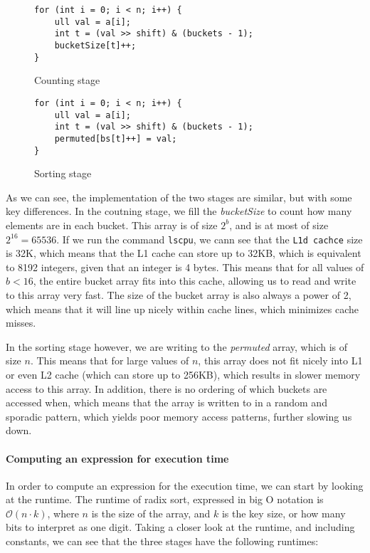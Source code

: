 \documentclass{article}
\begin{document}
\begin{figure}[h]
    \centering

    \begin{minipage}{0.47\textwidth}
        \begin{lstlisting}
for (int i = 0; i < n; i++) {
    ull val = a[i];
    int t = (val >> shift) & (buckets - 1);
    bucketSize[t]++;
}
        \end{lstlisting}
        \caption{Counting stage}
    \end{minipage}\hfill
    \begin{minipage}{0.47\textwidth}
        \begin{lstlisting}
for (int i = 0; i < n; i++) {
    ull val = a[i];                         
    int t = (val >> shift) & (buckets - 1);
    permuted[bs[t]++] = val;
}
        \end{lstlisting}
        \caption{Sorting stage}
    \end{minipage}
    \end{figure}

    As we can see, the implementation of the two stages are similar, but with some key differences. In the coutning stage, we fill the \textit{bucketSize} to count how many elements are in each bucket. This array is of size \( 2^{b} \), and is at most of size \( 2^{16} = 65536 \). If we run the command \texttt{lscpu}, we cann see that the \texttt{L1d cachce} size is 32K, which means that the L1 cache can store up to 32KB, which is equivalent to 8192 integers, given that an integer is 4 bytes. This means that for all values of \( b < 16\), the entire bucket array fits into this cache, allowing us to read and write to this array very fast. The size of the bucket array is also always a power of 2, which means that it will line up nicely within cache lines, which minimizes cache misses.
\medskip

In the sorting stage however, we are writing to the \textit{permuted} array, which is of size \( n \). This means that for large values of \( n \), this array does not fit nicely into L1 or even L2 cache (which can store up to 256KB), which results in slower memory access to this array. In addition, there is no ordering of which buckets are accessed when, which means that the array is written to in a random and sporadic pattern, which yields poor memory access patterns, further slowing us down.
\medskip

\paragraph{Computing an expression for execution time}
In order to compute an expression for the execution time, we can start by looking at the runtime. The runtime of radix sort, expressed in big O notation is \( \mathcal{O}\left(n \cdot  k\right) \), where \( n \) is the size of the array, and \( k \) is the key size, or how many bits to interpret as one digit. Taking a closer look at the runtime, and including constants, we can see that the three stages have the following runtimes:
\end{document}
